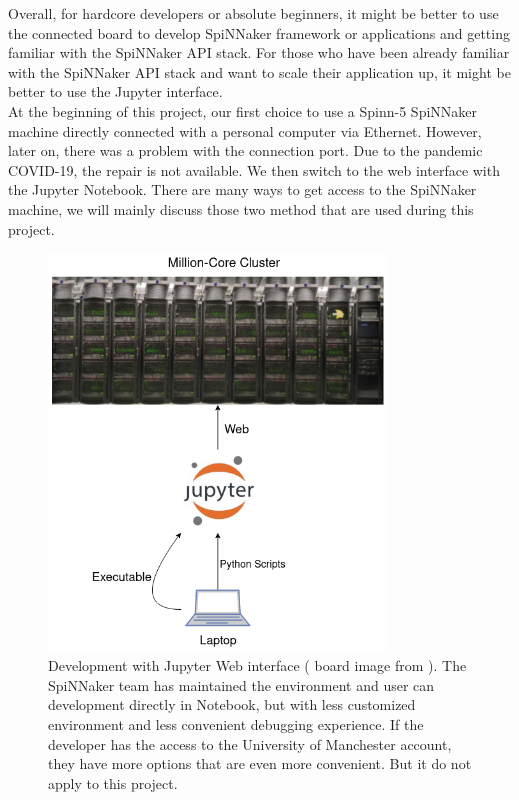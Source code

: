 Overall, for hardcore developers or absolute beginners, it might be better to use the connected board to develop SpiNNaker framework or applications and getting familiar with the SpiNNaker API stack. For those who have been already familiar with the SpiNNaker API stack and want to scale their application up, it might be better to use the Jupyter interface.\\

At the beginning of this project, our first choice to use a Spinn-5 SpiNNaker machine directly connected with a personal computer via Ethernet. However, later on, there was a problem with the connection port. Due to the pandemic COVID-19, the repair is not available. We then switch to the web interface with the Jupyter Notebook. There are many ways to get access to the SpiNNaker machine, we will mainly discuss those two method that are used during this project.\\

\begin{figure}[!tb]
\centering
    \centering
   \includegraphics[width=0.8\textwidth]{figures/jupyter.png}
       \caption{Development with Jupyter Web interface ( board image from \cite{spinn-core}). The SpiNNaker team has maintained the environment and user can development directly in Notebook, but with less customized environment and less convenient debugging experience. If the developer has the access to the University of Manchester account, they have more options that are even more convenient. But it do not apply to this project.}
       \label{fig:jupyter}
\end{figure}

